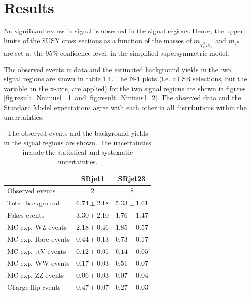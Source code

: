 \chapter{Results}
\label{ch:result}

No significant excess in signal is observed in the signal regions.
Hence, the upper limits of the SUSY cross sections as a function of the masses of $m_{\tilde{\chi}_1^\pm, \tilde{\chi}_2^0}$ and $m_{\tilde{\chi}_1^0}$ are set at the 95\% confidence level, in the simplified supersymmetric model.

The observed events in data and the estimated background yields in the two signal regions are shown in table \ref{tab:result_SR_result}.
The N-1 plots (i.e. all SR selections, but the variable on the x-axis, are applied) for the two signal regions are shown in figures \ref{fig:result_Nminus1_1} and \ref{fig:result_Nminus1_2}.
The observed data and the Standard Model expectations agree with each other in all distributions within the uncertainties.

\begin{table}[htbp]
\begin{center}
\begin{tabular}{|l|c|c|}
\hline
 & SRjet1 & SRjet23 \\
\hline
\hline
Observed events & 2 & 8 \\
\hline
Total background    & $6.74 \pm 2.18$ & $5.33 \pm 1.61$ \\
\hline
Fakes events        & $3.30 \pm 2.10$ & $1.76 \pm 1.47$ \\
MC exp. WZ events   & $2.18 \pm 0.46$ & $1.85 \pm 0.57$ \\
MC exp. Rare events & $0.44 \pm 0.13$ & $0.73 \pm 0.17$ \\
MC exp. ttV events  & $0.12 \pm 0.05$ & $0.14 \pm 0.05$ \\
MC exp. WW events   & $0.17 \pm 0.03$ & $0.51 \pm 0.07$ \\
MC exp. ZZ events   & $0.06 \pm 0.03$ & $0.07 \pm 0.04$ \\
Charge-flip events  & $0.47 \pm 0.07$ & $0.27 \pm 0.03$ \\
\hline
\end{tabular}
\caption{The observed events and the background yields in the signal regions are shown. The uncertainties include the statistical and systematic uncertainties.}
\label{tab:result_SR_result}
\end{center}
\end{table}

